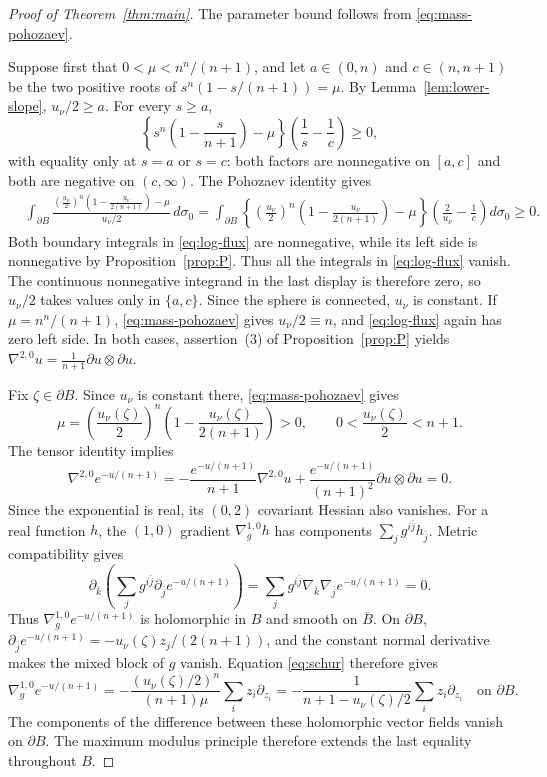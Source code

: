 \documentclass[11pt]{article}
\begin{document}
\begin{proof}[Proof of Theorem~\ref{thm:main}]
The parameter bound follows from \eqref{eq:mass-pohozaev}.

Suppose first that $0<\mu<n^n/(n+1)$, and let $a\in(0,n)$ and
$c\in(n,n+1)$ be the two positive roots of $s^n(1-s/(n+1))=\mu$.
By Lemma~\ref{lem:lower-slope}, $u_\nu/2\ge a$. For every $s\ge a$,
$$
 \left\{s^n\left(1-\frac{s}{n+1}\right)-\mu\right\}
 \left(\frac1s-\frac1c\right)\ge0,
$$
with equality only at $s=a$ or $s=c$: both factors are nonnegative
on $[a,c]$ and both are negative on $(c,\infty)$.
The Pohozaev identity gives
\begin{align*}
 &\int_{\partial B}\frac{
 \left(\frac{u_\nu}{2}\right)^n\left(1-\frac{u_\nu}{2(n+1)}\right)-\mu}
 {u_\nu/2}\,d\sigma_0=\int_{\partial B}
 \left\{\left(\frac{u_\nu}{2}\right)^n
 \left(1-\frac{u_\nu}{2(n+1)}\right)-\mu\right\}
 \left(\frac2{u_\nu}-\frac1c\right)d\sigma_0\ge0.
\end{align*}
Both boundary integrals in \eqref{eq:log-flux} are nonnegative,
while its left side is nonnegative by Proposition~\ref{prop:P}.
Thus all the integrals in \eqref{eq:log-flux} vanish. The continuous
nonnegative integrand in the last display is therefore zero, so
$u_\nu/2$ takes values only in $\{a,c\}$. Since the sphere is
connected, $u_\nu$ is constant. If $\mu=n^n/(n+1)$,
\eqref{eq:mass-pohozaev} gives $u_\nu/2\equiv n$, and
\eqref{eq:log-flux} again has zero left side. In both cases,
assertion~(3) of Proposition~\ref{prop:P} yields
$\nabla^{2,0}u=\frac1{n+1}\partial u\otimes\partial u$.

Fix $\zeta\in\partial B$. Since $u_\nu$ is constant there,
\eqref{eq:mass-pohozaev} gives
$$
 \mu=\left(\frac{u_\nu(\zeta)}{2}\right)^n
 \left(1-\frac{u_\nu(\zeta)}{2(n+1)}\right)>0,
 \qquad 0<\frac{u_\nu(\zeta)}2<n+1.
$$
The tensor identity implies
$$
 \nabla^{2,0}e^{-u/(n+1)}
 =-\frac{e^{-u/(n+1)}}{n+1}\nabla^{2,0}u
 +\frac{e^{-u/(n+1)}}{(n+1)^2}\partial u\otimes\partial u=0.
$$
Since the exponential is real, its $(0,2)$ covariant Hessian also
vanishes. For a real function $h$, the $(1,0)$ gradient
$\nabla_g^{1,0}h$ has components $\sum_jg^{i\bar j}h_{\bar j}$.
Metric compatibility gives
$$
 \partial_{\bar k}\left(\sum_jg^{i\bar j}
       \partial_{\bar j}e^{-u/(n+1)}\right)
 =\sum_jg^{i\bar j}\nabla_{\bar k}\nabla_{\bar j}e^{-u/(n+1)}=0.
$$
Thus $\nabla_g^{1,0}e^{-u/(n+1)}$ is holomorphic in $B$ and
smooth on $\overline B$.
On $\partial B$,
$\partial_{\bar j}e^{-u/(n+1)}=-u_\nu(\zeta)z_j/(2(n+1))$,
and the constant normal derivative makes the mixed block of $g$
vanish. Equation \eqref{eq:schur} therefore gives
$$
 \nabla_g^{1,0}e^{-u/(n+1)}
 =-\frac{(u_\nu(\zeta)/2)^n}{(n+1)\mu}
       \sum_i z_i\partial_{z_i}
 =-\frac1{n+1-u_\nu(\zeta)/2}\sum_i z_i\partial_{z_i}
 \quad\text{on }\partial B.
$$
The components of the difference between these holomorphic vector
fields vanish on $\partial B$. The maximum modulus principle
therefore extends the last equality throughout $B$.


\end{proof}
\end{document}
